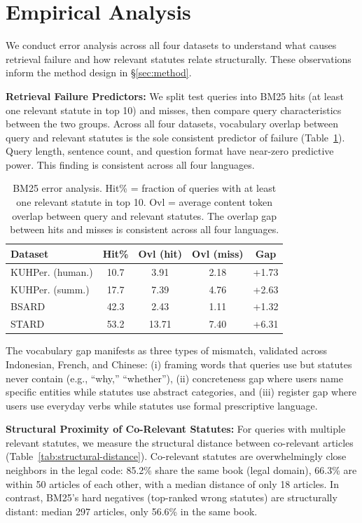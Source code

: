 \section{Empirical Analysis}
\label{sec:analysis}

We conduct error analysis across all four datasets to understand what causes retrieval failure and how relevant statutes relate structurally. These observations inform the method design in \S\ref{sec:method}.

\noindent\textbf{Retrieval Failure Predictors:} We split test queries into BM25 hits (at least one relevant statute in top 10) and misses, then compare query characteristics between the two groups. Across all four datasets, vocabulary overlap between query and relevant statutes is the sole consistent predictor of failure (Table~\ref{tab:failure-analysis}). Query length, sentence count, and question format have near-zero predictive power. This finding is consistent across all four languages.

\begin{table}[t]
\centering
\small
\begin{tabular}{lcccc}
\hline
\textbf{Dataset} & \textbf{Hit\%} & \textbf{Ovl (hit)} & \textbf{Ovl (miss)} & \textbf{Gap} \\
\hline
KUHPer. (human.) & 10.7 & 3.91 & 2.18 & +1.73 \\
KUHPer. (summ.) & 17.7 & 7.39 & 4.76 & +2.63 \\
BSARD & 42.3 & 2.43 & 1.11 & +1.32 \\
STARD & 53.2 & 13.71 & 7.40 & +6.31 \\
\hline
\end{tabular}
\caption{\label{tab:failure-analysis}
BM25 error analysis. Hit\% = fraction of queries with at least one relevant statute in top 10. Ovl = average content token overlap between query and relevant statutes. The overlap gap between hits and misses is consistent across all four languages.
}
\end{table}

The vocabulary gap manifests as three types of mismatch, validated across Indonesian, French, and Chinese: (i) framing words that queries use but statutes never contain (e.g., ``why,'' ``whether''), (ii) concreteness gap where users name specific entities while statutes use abstract categories, and (iii) register gap where users use everyday verbs while statutes use formal prescriptive language.

\noindent\textbf{Structural Proximity of Co-Relevant Statutes:} For queries with multiple relevant statutes, we measure the structural distance between co-relevant articles (Table~\ref{tab:structural-distance}). Co-relevant statutes are overwhelmingly close neighbors in the legal code: 85.2\% share the same book (legal domain), 66.3\% are within 50 articles of each other, with a median distance of only 18 articles. In contrast, BM25's hard negatives (top-ranked wrong statutes) are structurally distant: median 297 articles, only 56.6\% in the same book.


